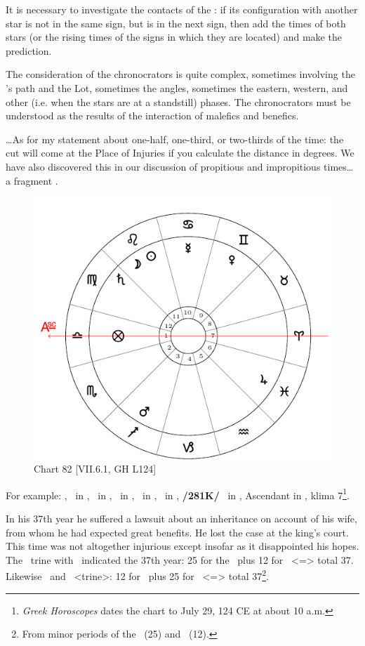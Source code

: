 It is necessary to investigate the contacts of the \Moon: if its configuration with another star is not in the same sign, but is in the next sign, then add the times of both stars (or the rising times of the signs in which they are located) and make the prediction. 

The consideration of the chronocrators is quite complex, sometimes involving the \Moon’s path and the Lot, sometimes the angles, sometimes the eastern, western, and other (i.e. when the stars are at a standstill) phases. The chronocrators must be understood as the
results of the interaction of malefics and benefics.

…As for my statement about one-half, one-third, or two-thirds of the time: the cut will come at the Place of Injuries if you calculate the distance in degrees. We have also discovered this in our discussion of
propitious and impropitious times… a fragment .

\begin{figure}
\centering
\vspace{-10pt}
\includegraphics[width=.68\textwidth]{charts/7_6_01}
\caption{Chart 82 [VII.6.1, GH L124]}
\label{fig:chart82}
\end{figure} 

For example: \Sun, \Moon\, in \Leo, \Saturn\, in \Virgo, \Jupiter\, in \Pisces, \Mars\, in \Sagittarius, \Venus\, in \Gemini, \textbf{/281K/} \Mercury\, in \Cancer, Ascendant in \Libra, klima 7\footnote{\textit{Greek Horoscopes} dates the chart to July 29, 124 CE at about 10 a.m.}. 

In his 37th year he suffered a lawsuit about an inheritance on account of his wife, from whom he had expected great benefits. He lost the case at the king’s court. This time was not altogether injurious except insofar as it disappointed his hopes. The \Moon\, trine with \Mars\, indicated the 37th year: 25 for the \Moon\, plus 12 for \Sagittarius\, <=\Jupiter> total 37. Likewise \Jupiter\, and \Mercury\, <trine>: 12 for \Jupiter\, plus 25 for \Cancer\, <=\Moon> total 37\footnote{From minor periods of the \Moon\, (25) and \Jupiter\, (12).}. 


